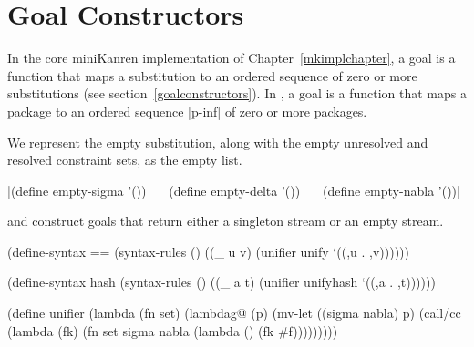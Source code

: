 


\section{Goal Constructors}\label{akgoalconstructorimplsection}

In the core miniKanren implementation of Chapter~\ref{mkimplchapter},
a goal is a function that maps a substitution  to an ordered
sequence of zero or more substitutions (see
section~\ref{goalconstructors}).  In \alphakanren, a goal 
is a function that maps a package  to an ordered
sequence \scheme|p-inf| of zero or more packages.  

We represent the empty substitution, 
along with the empty unresolved and resolved
constraint sets, as the empty list.

\wspace

\noindent \scheme|(define empty-sigma '()) $~~~~~$ (define empty-delta '()) $~~~~~$ (define empty-nabla '())|

\wspace

\scheme{==} and  construct goals that return either a
singleton stream or an empty stream.

\schemedisplayspace
\begin{schemedisplay}
(define-syntax ==
  (syntax-rules ()
    ((_ u v)
     (unifier unify `((,u . ,v))))))
\end{schemedisplay}
\newpage
\begin{schemedisplay}
(define-syntax hash
  (syntax-rules ()
    ((_ a t)
     (unifier unifyhash `((,a . ,t))))))

(define unifier
  (lambda (fn set)
    (lambdag@ (p)
      (mv-let ((sigma nabla) p)
        (call/cc (lambda (fk) (fn set sigma nabla (lambda () (fk #f)))))))))
\end{schemedisplay}

